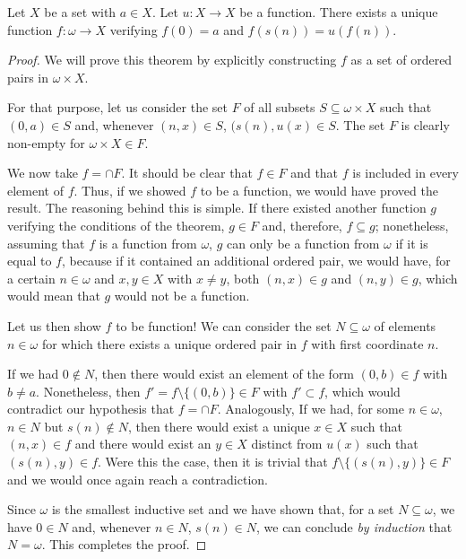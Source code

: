 \begin{theorem}
Let $X$ be a set with $a \in X$. Let $u:X\longrightarrow X$ be a function. There exists a unique function $f:\omega \longrightarrow X$ verifying $f(0) = a$ and $f(s(n)) = u(f(n))$.
\label{<+label+>}
\end{theorem}

\begin{proof}
We will prove this theorem by explicitly constructing $f$ as a set of ordered pairs in $\omega\times X$.

For that purpose, let us consider the set $F$ of all subsets $S\subseteq \omega \times X$ such that $(0,a)\in S$ and, whenever $(n,x)\in S$, $(s(n),u(x)
\in S$.
The set $F$ is clearly non-empty for $\omega \times X\in F$.

We now take $f = \cap F$.
It should be clear that $f\in F$ and that $f$ is included in every element of $f$.
Thus, if we showed $f$ to be a function, we would have proved the result.
The reasoning behind this is simple.
If there existed another function $g$ verifying the conditions of the theorem, $g\in F$ and, therefore, $f\subseteq g$; nonetheless, assuming that $f$ is a function from $\omega$, $g$ can only be a function from $\omega$ if it is equal to $f$, because if it contained an additional ordered pair, we would have, for a certain $n\in \omega$ and $x,y\in X$ with $x\neq y$, both $(n,x)\in g$ and $(n,y)\in g$, which would mean that $g$ would not be a function.

Let us then show $f$ to be function! We can consider the set $N\subseteq \omega$ of elements $n\in \omega$ for which there exists a unique ordered pair in $f$ with first coordinate $n$.

If we had $0\not\in N$, then there would exist an element of the form $(0,b)\in f$ with $b\neq a$. Nonetheless, then $f' = f\setminus \{(0,b)\}\in F$ with $f'\subset f$, which would contradict our hypothesis that $f = \cap F$.
Analogously, If we had, for some $n\in \omega$, $n\in N$ but $s(n)\not\in N$, then there would exist a unique $x\in X$ such that $(n,x)\in f$ and there would exist an $y \in X$ distinct from $u(x)$ such that $(s(n), y)\in f$.
Were this the case, then it is trivial that $f\setminus \{(s(n),y)\}\in F$ and we would once again reach a contradiction.

Since $\omega$ is the smallest inductive set and we have shown that, for a set $N\subseteq \omega$, we have $0\in N$ and, whenever $n\in N$, $s(n) \in N$, we can conclude \emph{by induction} that $N = \omega$. This completes the proof. 
\end{proof}

